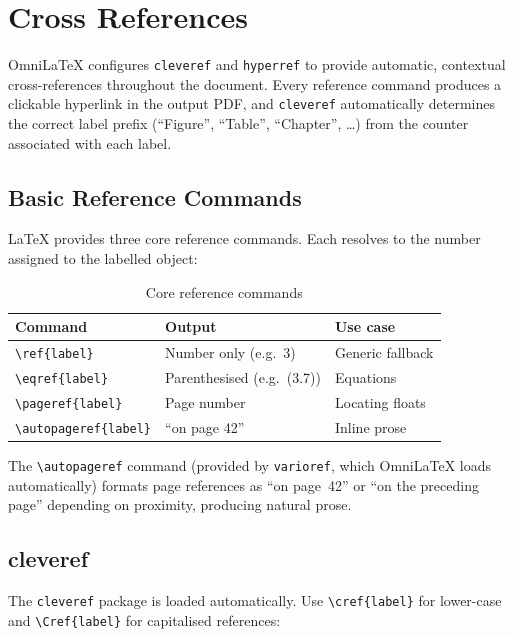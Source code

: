 \chapter{Cross References}
\label{ch:crossrefs}

OmniLaTeX configures \texttt{cleveref} and \texttt{hyperref} to provide
automatic, contextual cross-references throughout the document.  Every
reference command produces a clickable hyperlink in the output PDF, and
\texttt{cleveref} automatically determines the correct label prefix
(``Figure'', ``Table'', ``Chapter'', \ldots) from the counter associated
with each label.

\section{Basic Reference Commands}

\LaTeX{} provides three core reference commands.  Each resolves to the
number assigned to the labelled object:

\begin{table}[htbp]
  \centering
  \caption{Core reference commands}
  \label{tab:ref-commands}
  \begin{tabular}{@{}lll@{}}
    \toprule
    \textbf{Command} & \textbf{Output} & \textbf{Use case} \\
    \midrule
    \verb|\ref{label}|   & Number only (e.g.\ 3)       & Generic fallback \\
    \verb|\eqref{label}| & Parenthesised (e.g.\ (3.7)) & Equations \\
    \verb|\pageref{label}| & Page number              & Locating floats \\
    \verb|\autopageref{label}| & ``on page 42''       & Inline prose \\
    \bottomrule
  \end{tabular}
\end{table}

The \verb|\autopageref| command (provided by \texttt{varioref}, which
OmniLaTeX loads automatically) formats page references as ``on page~42''
or ``on the preceding page'' depending on proximity, producing natural
prose.

\section{cleveref}

The \texttt{cleveref} package is loaded automatically.  Use
\verb|\cref{label}| for lower-case and \verb|\Cref{label}| for
capitalised references:

